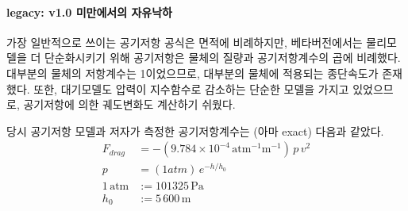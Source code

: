 \documentclass[9pt]{amsbook}
\begin{document}
\paragraph{legacy: v1.0 미만에서의 자유낙하}
가장 일반적으로 쓰이는 공기저항 공식은 면적에 비례하지만, 
베타버전에서는 물리모델을 더 단순화시키기 위해 공기저항은 물체의 질량과 공기저항계수의 곱에 비례했다.
대부분의 물체의 저항계수는 1이었으므로,
대부분의 물체에 적용되는 종단속도가 존재했다.
또한, 대기모델도 압력이 지수함수로 감소하는 단순한 모델을 가지고 있었으므로,
공기저항에 의한 궤도변화도 계산하기 쉬웠다.

당시 공기저항 모델과 저자가 측정한 공기저항계수는 (아마 exact) 다음과 같았다.
\begin{align}
F_{drag}&=-(9.784\times 10^{-4}\, \mathrm{atm}^{-1}\mathrm{m}^{-1})\, p\, v^2
\\p&=(1 atm)\,e^{-h/h_0}
\\1\,\mathrm{atm} &:= 101325\,\mathrm{Pa}
\\h_0&:= 5\,600\,\mathrm{m}
\end{align}
\end{document}
